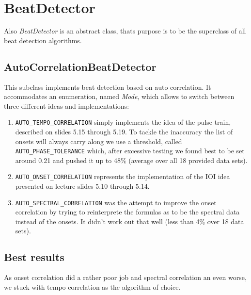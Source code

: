 \section{\ttfamily BeatDetector}
Also \emph{BeatDetector} is an abstract class, thats purpose is to be the
superclass of all beat detection algorithms. 

\subsection{\ttfamily AutoCorrelationBeatDetector}
This subclass implements beat detection based on auto correlation. It
accommodates an enumeration, named \emph{Mode}, which allows to switch between
three different ideas and implementations:

\begin{enumerate}
  \item \texttt{AUTO\_TEMPO\_CORRELATION} simply implements the idea of the
  pulse train, described on slides 5.15 through 5.19. To tackle the inaccuracy the
  list of onsets will always carry along we use a threshold, called
  \texttt{AUTO\_PHASE\_TOLERANCE} which, after excessive testing we found best
  to be set around 0.21 and pushed it up to 48\% (average over all 18 provided data
  sets).
  \item \texttt{AUTO\_ONSET\_CORRELATION} represents the implementation of the
  IOI idea presented on lecture slides 5.10 through 5.14.
  \item \texttt{AUTO\_SPECTRAL\_CORRELATION} was the attempt to improve the
  onset correlation by trying to reinterprete the formulas as to be the spectral data
  instead of the onsets. It didn't work out that well (less than 4\% over 18
  data sets).
\end{enumerate}

\subsection{Best results}
As onset correlation did a rather poor job and spectral correlation an even
worse, we stuck with tempo correlation as the algorithm of choice.
